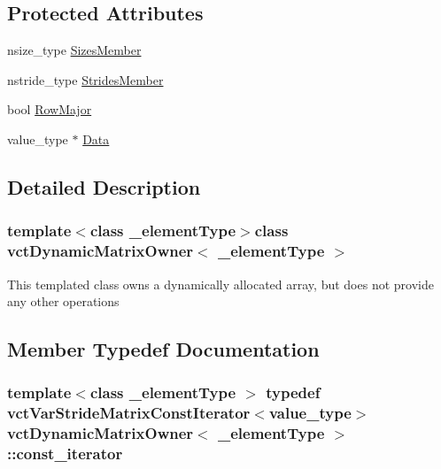 \subsection*{Protected Attributes}
\begin{DoxyCompactItemize}
\item 
nsize\+\_\+type \hyperlink{classvct_dynamic_matrix_owner_a097dc19836d0b333289b633b9825d079}{Sizes\+Member}
\item 
nstride\+\_\+type \hyperlink{classvct_dynamic_matrix_owner_ab172c2ecf28deae244fb5f776dad0bef}{Strides\+Member}
\item 
bool \hyperlink{classvct_dynamic_matrix_owner_a5f3826269134e26c85b4ef66a2667c18}{Row\+Major}
\item 
value\+\_\+type $\ast$ \hyperlink{classvct_dynamic_matrix_owner_a5bbb48bdf7525decefe9b415c0ddc3b9}{Data}
\end{DoxyCompactItemize}


\subsection{Detailed Description}
\subsubsection*{template$<$class \+\_\+element\+Type$>$class vct\+Dynamic\+Matrix\+Owner$<$ \+\_\+element\+Type $>$}

This templated class owns a dynamically allocated array, but does not provide any other operations 

\subsection{Member Typedef Documentation}
\hypertarget{classvct_dynamic_matrix_owner_ac83fab5858a222a2debcf2059c9f06e2}{}
\subsubsection[{const\+\_\+iterator}]{\setlength{\rightskip}{0pt plus 5cm}template$<$class \+\_\+element\+Type $>$ typedef {\bf vct\+Var\+Stride\+Matrix\+Const\+Iterator}$<$value\+\_\+type$>$ {\bf vct\+Dynamic\+Matrix\+Owner}$<$ \+\_\+element\+Type $>$\+::{\bf const\+\_\+iterator}}\label{classvct_dynamic_matrix_owner_ac83fab5858a222a2debcf2059c9f06e2}
\hypertarget{classvct_dynamic_matrix_owner_a3f5a649a5285f9909e4628151d9cdac1}{}
